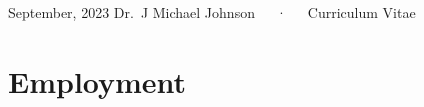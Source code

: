 \documentclass[11pt,a4paper,]{awesome-cv}
\begin{document}
\makecvheader

\makecvfooter
  {September, 2023}
    {Dr.~J Michael Johnson~~~·~~~Curriculum Vitae}
  {\thepage}





\hypertarget{employment}{%
\section{Employment}\label{employment}}
\end{document}
